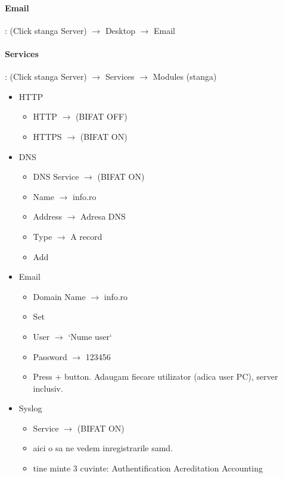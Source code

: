 \documentclass{article}
\begin{document}
\paragraph{Email}:
(Click stanga Server) $\rightarrow$ Desktop $\rightarrow$ Email
\newpage
\paragraph{Services}:
(Click stanga Server) $\rightarrow$ Services $\rightarrow$ Modules (stanga)


\begin{itemize}
    \item HTTP
        \begin{itemize}
            \item  HTTP $\rightarrow$ (BIFAT OFF)
            \item  HTTPS $\rightarrow$ (BIFAT ON)
        \end{itemize}
    \item DNS
        \begin{itemize}
            \item DNS Service $\rightarrow$ (BIFAT ON)
            \item Name $\rightarrow$ info.ro
            \item Address $\rightarrow$ Adresa DNS
            \item Type $\rightarrow$ A record
            \item Add
        \end{itemize}
    \item Email
        \begin{itemize}
            \item Domain Name $\rightarrow$ info.ro
            \item Set
            \item User $\rightarrow$ `Nume user`
            \item Password $\rightarrow$ 123456
            \item Press + button. Adaugam fiecare utilizator (adica user PC), server inclusiv.
        \end{itemize}
    \item Syslog
        \begin{itemize}
            \item Service $\rightarrow$ (BIFAT ON)
            \item aici o sa ne vedem inregistrarile samd.
            \item tine minte 3 cuvinte: Authentification Acreditation Accounting

\end{itemize}
\end{itemize}
\end{document}
